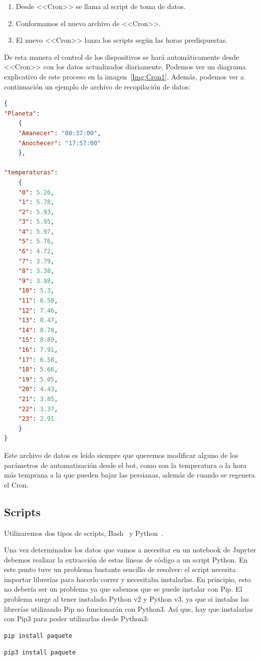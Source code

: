 \begin{enumerate}
    \item Desde <<Cron>> se llama al script de toma de datos.
    \item Conformamos el nuevo archivo de <<Cron>>.
    \item El nuevo <<Cron>> lanza los scripts según las horas predispuestas.
\end{enumerate}

De esta manera el control de los dispositivos se hará automáticamente desde <<Cron>> con los datos actualizados diariamente. Podemos ver un diagrama explicativo de este proceso en la imagen~\ref{Img:Cron1}. Además, podemos ver a continuación un ejemplo de archivo de recopilación de datos:

\begin{minipage}{\linewidth}
\begin{lstlisting}[language=json, basicstyle=\small, caption={Ejemplo archivo de recopilado de datos.}]
{
"Planeta":
	{
	"Amanecer": "08:37:00",
	"Anochecer": "17:57:00"
	},

"temperaturas":
	{
	"0": 5.26,
	"1": 5.78,
	"2": 5.93,
	"3": 5.95,
	"4": 5.97,
	"5": 5.76,
	"6": 4.72,
	"7": 3.79,
	"8": 3.38,
	"9": 3.98,
	"10": 5.3,
	"11": 6.58,
	"12": 7.46,
	"13": 8.47,
	"14": 8.78,
	"15": 8.89,
	"16": 7.91,
	"17": 6.58,
	"18": 5.66,
	"19": 5.05,
	"20": 4.43,
	"21": 3.85,
	"22": 3.37,
	"23": 2.91
	}
}
\end{lstlisting}
\end{minipage}

Este archivo de datos es leído siempre que queremos modificar alguno de los parámetros de automatización desde el bot, como son la temperatura o la hora más temprana a la que pueden bajar las persianas, además de cuando se regenera el Cron.

\subsection{Scripts}
Utilizaremos dos tipos de scripts, Bash~\cite{misc:Linux} y Python~\cite{misc:Python}.

Una vez determinados los datos que vamos a necesitar en un notebook de Jupyter debemos realizar la extracción de estas líneas de código a un script Python.
En este punto tuve un problema bastante sencillo de resolver: el script necesita importar librerías para hacerlo correr y necesitaba instalarlas. En principio, esto no debería ser un problema ya que sabemos que se puede instalar con Pip. El problema surge al tener instalado Python v2 y Python v3, ya que si instalas las librerías utilizando Pip no funcionarán con Python3. Así que, hay que instalarlas con Pip3 para poder utilizarlas desde Python3:
\begin{lstlisting}[language=cpp,firstnumber=0]
pip install paquete
\end{lstlisting}
\begin{lstlisting}[language=cpp,firstnumber=1]
pip3 install paquete
\end{lstlisting}

